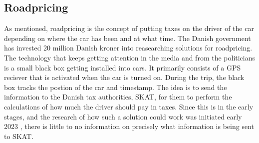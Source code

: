 \subsection{Roadpricing}
As mentioned, roadpricing is the concept of putting taxes on the driver of the car depending on where the car has been and at what time. The Danish government has invested 20 million Danish kroner into reasearching solutions for roadpricing. The technology that keeps getting attention in the media and from the politicians is a small black box getting installed into cars. It primarily consists of a GPS reciever that is activated when the car is turned on. During the trip, the black box tracks the postion of the car and timestamp. The idea is to send the information to the Danish tax authorities, SKAT, for them to perform the calculations of how much the driver should pay in taxes. Since this is in the early stages, and the research of how such a solution could work was initiated early 2023 \cite{kbh-liv:2023}, there is little to no information on precisely what information is being sent to SKAT.